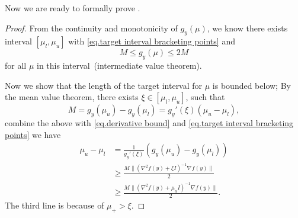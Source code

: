 \documentclass{mcom-l}
\numberwithin{equation}{section}
\begin{document}
Now we are ready to formally prove .
\begin{proof}
    From the continuity and monotonicity of $g_y(\mu)$, we know there exists interval $[\mu_l,\mu_u]$ with \eqref{eq.target interval bracketing points} and
    \begin{equation*}
        M\leq g_y(\mu)\leq 2M
    \end{equation*}
    for all $\mu$ in this interval~(intermediate value theorem).

    Now we show that the length of the target interval for $\mu$ is bounded below; By the mean value theorem, there exists $\xi\in \left [\mu_l,\mu_u\right]$, such that
    \begin{equation*}
        M=g_y(\mu_u)-g_y(\mu_l) = g_y'(\xi)(\mu_u-\mu_l),
    \end{equation*}
    combine the above with \eqref{eq.derivative bound} and \eqref{eq.target interval bracketing points} we have
    \begin{equation*}
        \begin{aligned}
            \mu_u-\mu_l & =  \frac{1}{g_y'(\xi)}\left(g_y(\mu_u)-g_y(\mu_l)\right)                    \\
                        & \geq \frac{M\|\left (\nabla ^2 f(y)+\xi I \right )^{-1}\nabla f(y)\|}{2}    \\
                        & \geq \frac{M\|\left (\nabla ^2 f(y)+\mu_u I \right )^{-1}\nabla f(y)\|}{2}.
        \end{aligned}
    \end{equation*}
    The third line is because of $\mu_+ >\xi$.
\end{proof}
\end{document}
